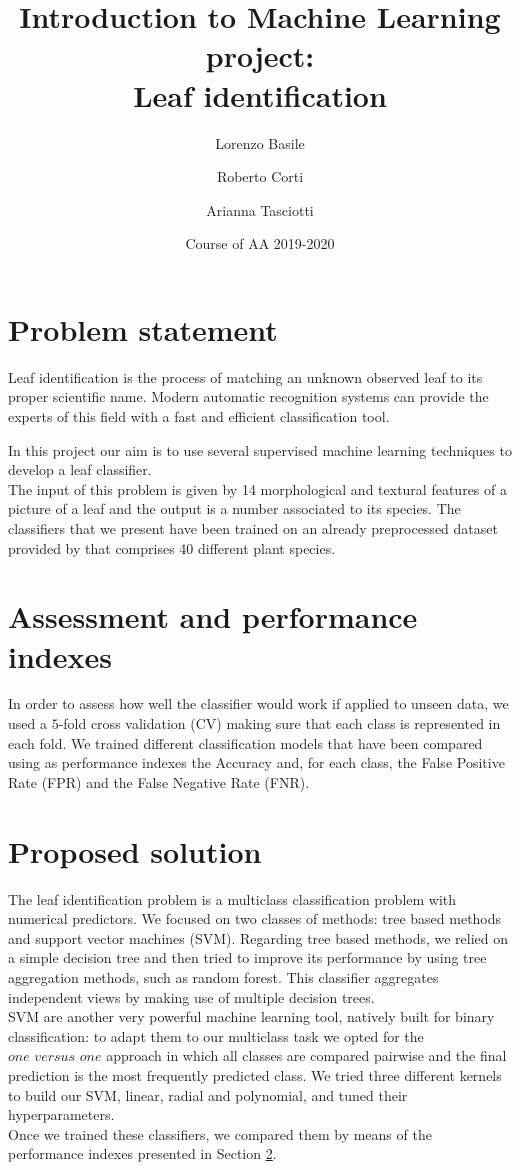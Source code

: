 \documentclass{article}
\title{Introduction to Machine Learning project:\\ Leaf identification}
\author[1]{Lorenzo Basile}
\author[2]{Roberto Corti}
\author[3]{Arianna Tasciotti}
\affil[1,2,3]{
    problem statement,
    solution design,
    solution development,
    writing
}
\date{Course of AA 2019-2020}
\begin{document}
\maketitle



\section{Problem statement}
Leaf identification is the process of matching an unknown observed leaf to its proper scientific name. Modern automatic recognition systems can provide the experts of this field with a fast and efficient classification tool. 

In this project our aim is to use several supervised machine learning techniques to develop a leaf classifier. \\
The input of this problem is given by 14 morphological and textural features of a picture of a leaf and the output is a number associated to its species. The classifiers that we present have been trained on an already preprocessed dataset provided by \cite{silva} that comprises 40 different plant species.

\section{Assessment and performance indexes}\label{2}
In order to assess how well the classifier would work if applied to unseen data, we used a $5$-fold cross validation (CV) making sure that each class is represented in each fold. We trained different classification models that have been compared using as performance indexes the Accuracy and, for each class, the False Positive Rate (FPR) and the False Negative Rate (FNR).

\section{Proposed solution}\label{3}
The leaf identification problem is a multiclass classification problem with numerical predictors. We focused on two classes of methods: tree based methods and support vector machines (SVM).
Regarding tree based methods, we relied on a simple decision tree and then tried to improve its performance by using tree aggregation methods, such as random forest. This classifier aggregates independent views by making use of multiple decision trees. 
\\SVM are another very powerful machine learning tool, natively built for binary classification: to adapt them to our multiclass task we opted for the $\textit{one versus one}$ approach in which all classes are compared pairwise and the final prediction is the most frequently predicted class. We tried three different kernels to build our SVM, linear, radial and polynomial, and tuned their hyperparameters.
\\Once we trained these classifiers, we compared them by means of the performance indexes presented in Section \ref{2}.
\end{document}
